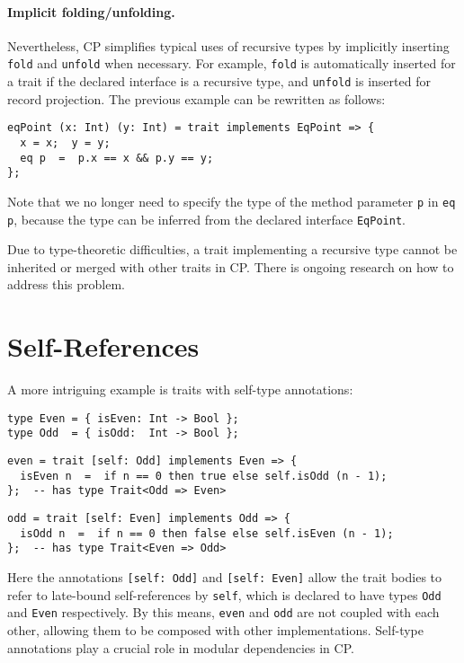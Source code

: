 \paragraph{Implicit folding/unfolding.}
Nevertheless, CP simplifies typical uses of recursive types by implicitly
inserting \lstinline{fold} and \lstinline{unfold} when necessary. For example,
\lstinline{fold} is automatically inserted for a trait if the declared interface
is a recursive type, and \lstinline{unfold} is inserted for record projection.
The previous example can be rewritten as follows:
\begin{lstlisting}
eqPoint (x: Int) (y: Int) = trait implements EqPoint => {
  x = x;  y = y;
  eq p  =  p.x == x && p.y == y;
};
\end{lstlisting}
Note that we no longer need to specify the type of the method parameter
\lstinline{p} in \lstinline{eq p}, because the type can be inferred from the
declared interface \lstinline{EqPoint}.

\begin{tipblock}
Due to type-theoretic difficulties, a trait implementing a recursive type cannot
be inherited or merged with other traits in CP. There is ongoing research on how
to address this problem.
\end{tipblock}

\section{Self-References}

A more intriguing example is traits with self-type annotations:
\begin{lstlisting}
type Even = { isEven: Int -> Bool };
type Odd  = { isOdd:  Int -> Bool };
\end{lstlisting}
\vspace{-1ex}
\begin{lstlisting}
even = trait [self: Odd] implements Even => {
  isEven n  =  if n == 0 then true else self.isOdd (n - 1);
};  -- has type Trait<Odd => Even>
\end{lstlisting}
\vspace{-1ex}
\begin{lstlisting}
odd = trait [self: Even] implements Odd => {
  isOdd n  =  if n == 0 then false else self.isEven (n - 1);
};  -- has type Trait<Even => Odd>
\end{lstlisting}
Here the annotations \lstinline{[self: Odd]} and \lstinline{[self: Even]} allow
the trait bodies to refer to late-bound self-references by \lstinline{self},
which is declared to have types \lstinline{Odd} and \lstinline{Even}
respectively. By this means, \lstinline{even} and \lstinline{odd} are not
coupled with each other, allowing them to be composed with other
implementations. Self-type annotations play a crucial role in modular
dependencies in CP.

